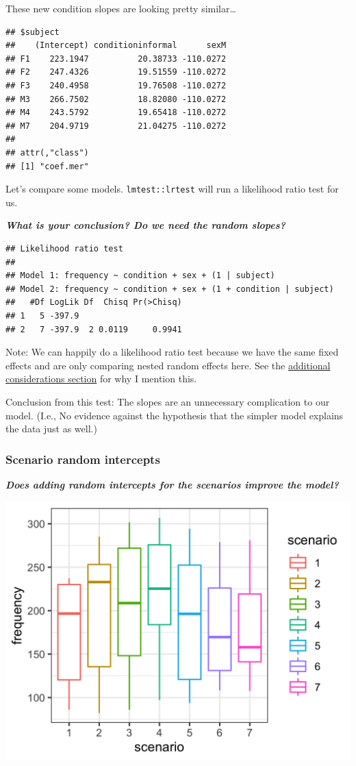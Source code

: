 \documentclass[
  openany]{book}
\begin{document}
These new condition slopes are looking pretty similar\ldots{}

\begin{verbatim}
## $subject
##    (Intercept) conditioninformal      sexM
## F1    223.1947          20.38733 -110.0272
## F2    247.4326          19.51559 -110.0272
## F3    240.4958          19.76508 -110.0272
## M3    266.7502          18.82080 -110.0272
## M4    243.5792          19.65418 -110.0272
## M7    204.9719          21.04275 -110.0272
## 
## attr(,"class")
## [1] "coef.mer"
\end{verbatim}

Let's compare some models. \texttt{lmtest::lrtest} will run a likelihood ratio test for us.

\textbf{\emph{What is your conclusion? Do we need the random slopes?}}

\begin{verbatim}
## Likelihood ratio test
## 
## Model 1: frequency ~ condition + sex + (1 | subject)
## Model 2: frequency ~ condition + sex + (1 + condition | subject)
##   #Df LogLik Df  Chisq Pr(>Chisq)
## 1   5 -397.9                     
## 2   7 -397.9  2 0.0119     0.9941
\end{verbatim}

Note: We can happily do a likelihood ratio test because we have the same fixed effects and are only comparing nested random effects here. See the \protect\hyperlink{reml}{additional considerations section} for why I mention this.

Conclusion from this test: The slopes are an unnecessary complication to our model. (I.e., No evidence against the hypothesis that the simpler model explains the data just as well.)

\hypertarget{scenario-random-intercepts}{%
\subsubsection{Scenario random intercepts}\label{scenario-random-intercepts}}

\textbf{\emph{Does adding random intercepts for the scenarios improve the model?}}

\includegraphics[width=16.67in]{images/m3/scen_int}
\end{document}
